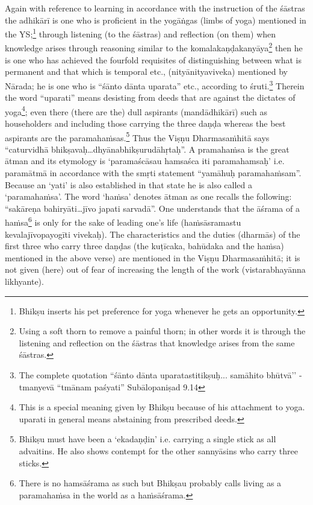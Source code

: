 Again with reference to learning in accordance with the instruction of the śāstras the adhikārī is one who is proficient in the yogāṅgas (limbs of yoga) mentioned in the YS;\footnote{Bhikṣu inserts his pet preference for yoga whenever he gets an opportunity.} through listening (to the śāstras) and reflection (on them) when knowledge arises through reasoning similar to the komalakaṇḍakanyāya\footnote{Using a soft thorn to remove a painful thorn; in other words it is through the listening and reflection on the śāstras that knowledge arises from the same śāstras.} then he is one who has achieved the fourfold requisites of distinguishing between what is permanent and that which is temporal etc., (nityānityaviveka) mentioned by Nārada; he is one who is “śānto dānta uparata” etc., according to śruti.\footnote{The complete quotation “śānto dānta uparatastitikṣuḥ... samāhito bhūtvā’’ - tmanyevā ``tmānam paśyati” Subālopaniṣad 9.14}  Therein the word “uparati” means desisting from deeds that are against the dictates of yoga\footnote{This is a special meaning given by Bhikṣu because of his attachment to yoga. uparati in general means abstaining from prescribed deeds.}; even there (there are the) dull aspirants (mandādhikārī) such as householders and including those carrying the three daṇḍa whereas the best aspirants are the paramahaṁsas.\footnote{Bhikṣu must have been a ‘ekadaṇḍin’ i.e. carrying a single stick as all advaitins. He also shows contempt for the other sannyāsins who carry three sticks.} Thus the Viṣṇu Dharmasaṁhitā says “caturvidhā bhikṣavaḥ…dhyānabhikṣurudāhṛtaḥ”.  A pramahaṁsa is the great ātman and its etymology is ‘paramaścāsau hamsaśca iti paramahamsaḥ’ i.e. paramātmā in accordance with the smṛti statement “yamāhuḥ paramahaṁsam”. Because an ‘yati’ is also established in that state he is also called a ‘paramahaṁsa’. The word ‘haṁsa’ denotes ātman as one recalls the following: “sakāreṇa bahiryāti…jīvo japati sarvadā”. One understands that the āśrama of a haṁsa\footnote{There is no hamsāśrama as such but Bhikṣau probably calls living as a paramahaṁsa in the world as a haṁsāśrama.} is only for the sake of leading one’s life (haṁsāsramastu kevalajīvopayogīti vivekaḥ). The characteristics and the duties (dharmās) of the first three who carry three daṇḍas (the kuṭīcaka, bahūdaka and the haṁsa) mentioned in the above verse) are mentioned in the Viṣṇu Dharmasaṁhitā; it is not given (here) out of fear of increasing   the length of the work (vistarabhayānna likhyante). 

